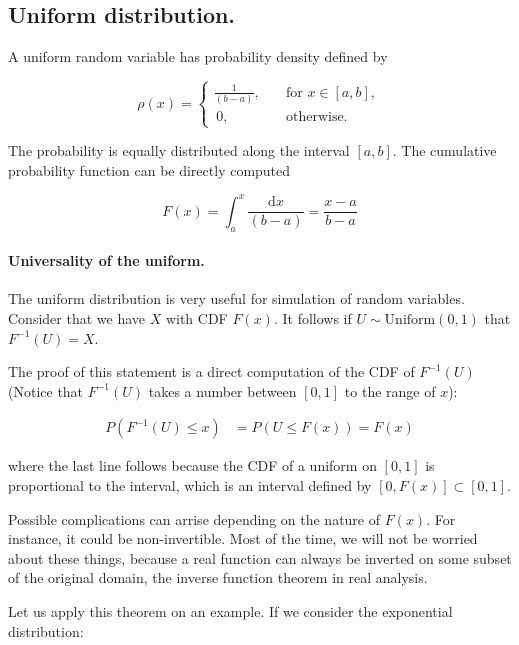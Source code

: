 \documentclass[12pt]{article}
\begin{document}
\subsection{Uniform distribution.}

A uniform random variable has probability density defined by

\begin{equation}
\rho(x) = 
\begin{cases}
\frac{1}{(b - a)}, \quad &\text{for } x \in [a,b], \\
\, 0, \quad &\text{otherwise.}
\end{cases}
\end{equation}

\noindent
The probability is equally distributed along the interval $[a,b]$.
The cumulative probability function can be directly computed

\begin{equation}
F(x) = \int_{a}^{x} \frac{\mathrm{d} x}{(b - a)}  
= \frac{x - a}{b - a}
\end{equation}

\paragraph{Universality of the uniform.}
The uniform distribution is very useful for simulation of random variables.
Consider that we have $X$ with CDF $F(x)$. It follows if $U \sim \text{Uniform}(0,1)$
that $F^{-1}(U) = X$.

The proof of this statement is a direct computation 
of the CDF of $F^{-1}(U)$ (Notice that $F^{-1}(U)$ takes a number between $[0,1]$ to
the range of $x$):

\begin{align}
P(F^{-1} ( U ) \leq x )  &= 
P(U \leq F(x) ) = F(x)
\end{align}

\noindent
where the last line follows because the CDF of a uniform on $[0,1]$ is 
proportional to the interval, which is an interval defined by $[0, F(x)] \subset [0, 1]$.

Possible complications can arrise depending on the nature of $F(x)$. 
For instance, it could be non-invertible.
Most of the time, we will not be worried about these things, because a real
function can always be inverted on some subset of the original domain, the 
inverse function theorem in real analysis.

Let us apply this theorem on an example. 
If we consider the exponential distribution:
\end{document}
